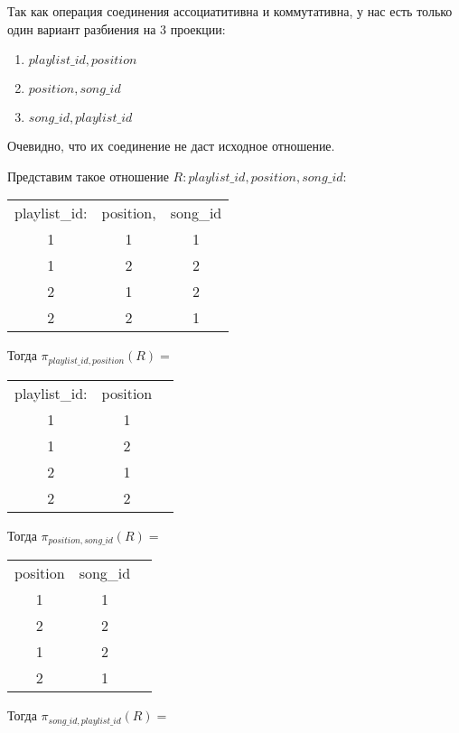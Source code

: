 \documentclass{article}
\begin{document}
	Так как операция соединения ассоциатитивна и коммутативна, у нас есть только один вариант разбиения на 3 проекции:
	
	\begin{enumerate}
		\item $playlist\_id, position$
		\item $position, song\_id$
		\item $song\_id, playlist\_id$
	\end{enumerate}

	Очевидно, что их соединение не даст исходное отношение. 
	
	Представим такое отношение $R: playlist\_id, position, song\_id$:
	
	\begin{center}
		\begin{tabular}{ccc}
			playlist\_id: & position,& song\_id \\
			1 & 1 & 1\\ 
			1 & 2& 2 \\
			2 & 1 & 2\\
			2 & 2 & 1 \\
		\end{tabular}
	\end{center}

	Тогда $\pi_{playlist\_id, position}(R) = $
	
		\begin{center}
		\begin{tabular}{ccc}
			playlist\_id: & position \\
			1 & 1\\
			1 & 2 \\
			2 & 1 \\
			2 & 2 \\
		\end{tabular}
	\end{center}

	Тогда $\pi_{position, song\_id}(R) = $
	
	\begin{center}
		\begin{tabular}{ccc}
			position & song\_id \\
			1 & 1\\
			2 & 2 \\
			1 & 2\\
			2 & 1\\
		\end{tabular}
	\end{center}

	Тогда $\pi_{song\_id, playlist\_id}(R) = $
	
\end{document}
